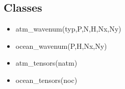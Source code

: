 \documentclass[letterpaper,10pt,english]{sphinxmanual}
\begin{document}
\subsection{Classes}
\label{rstfiles/inprod_analytic:classes}\begin{itemize}
\item {} 
atm\_wavenum(typ,P,N,H,Nx,Ny)

\item {} 
ocean\_wavenum(P,H,Nx,Ny)

\item {} 
atm\_tensors(natm)

\item {} 
ocean\_tensors(noc)

\end{itemize}
\end{document}
